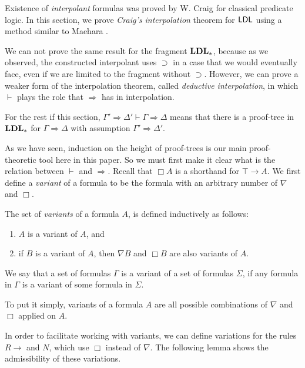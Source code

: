 Existence of \emph{interpolant} formulas was proved by W. Craig \cite{CraigA} for classical predicate logic. In this section, we prove \emph{Craig's interpolation} theorem for $\mathsf{LDL}$ using a method similar to Maehara \cite{maehara1960interpolation}.




We can not prove the same result for the fragment $\mathbf{LDL}_*$, because as we observed, the constructed interpolant uses $\supset$ in a case that we would eventually face, even if we are limited to the fragment without $\supset$. However, we can prove a weaker form of the interpolation theorem, called \emph{deductive interpolation}, in which $\vdash$ plays the role that $\Rightarrow$ has in interpolation.

\begin{nota}
  For the rest if this section, $\Gamma' \Rightarrow \Delta' \vdash \Gamma \Rightarrow \Delta$ means that there is a proof-tree in $\mathbf{LDL}_*$ for $\Gamma \Rightarrow \Delta$ with assumption $\Gamma' \Rightarrow \Delta'$.
\end{nota}

As we have seen, induction on the height of proof-trees is our main proof-theoretic tool here in this paper. So we must first make it clear what is the relation between $\vdash$ and $\Rightarrow$. Recall that $\Box A$ is a shorthand for $\top \rightarrow A$. We first define a \emph{variant} of a formula to be the formula with an arbitrary number of $\nabla$ and $\Box$.

\begin{dfn}
  The set of \emph{variants} of a formula $A$, is defined inductively as follows:
  \begin{enumerate}
    \item $A$ is a variant of $A$, and
    \item if $B$ is a variant of $A$, then $\nabla B$ and $\Box B$ are also variants of $A$.
  \end{enumerate}
  We say that a set of formulas $\Gamma$ is a variant of a set of formulas $\Sigma$, if any formula in $\Gamma$ is a variant of some formula in $\Sigma$.
\end{dfn}

To put it simply, variants of a formula $A$ are all possible combinations of $\nabla$ and $\Box$ applied on $A$.

In order to facilitate working with variants, we can define variations for the rules $R \rightarrow$ and $N$, which use $\Box$ instead of $\nabla$. The following lemma shows the admissibility of these variations.

